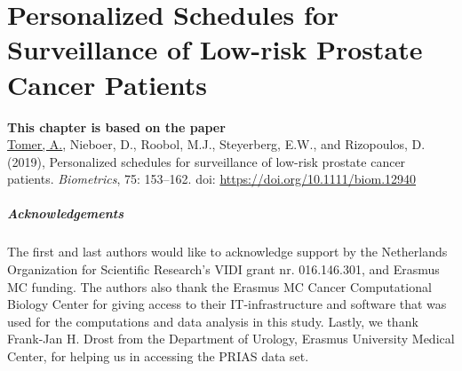 \chapter[Personalized Schedules for Surveillance of Low-risk Prostate Cancer Patients][Personalized Schedules]{Personalized Schedules for Surveillance of Low-risk Prostate Cancer Patients}
\label{c2}

\vspace*{\fill}
\textbf{This chapter is based on the paper}\\
\underline{Tomer, A.}, Nieboer, D., Roobol, M.J., Steyerberg, E.W., and Rizopoulos, D. (2019), Personalized schedules for surveillance of low-risk prostate cancer patients. \emph{Biometrics}, 75: 153--162. doi: \url{https://doi.org/10.1111/biom.12940}

\clearpage

\clearpage








\paragraph{Acknowledgements}
The first and last authors would like to acknowledge support by the Netherlands Organization for Scientific Research's VIDI grant nr. 016.146.301, and Erasmus MC funding. The authors also thank the Erasmus MC Cancer Computational Biology Center for giving access to their IT-infrastructure and software that was used for the computations and data analysis in this study. Lastly, we thank Frank-Jan H. Drost from the Department of Urology, Erasmus University Medical Center, for helping us in accessing the PRIAS data set.



\clearpage


